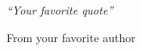 \documentclass[a4paper, 11pt, twoside, openright]{Thesis}  %
\numberwithin{algorithm}{chapter}
\begin{document}
 

 
\pagestyle{empty}
\mbox{}
\clearpage
\pagestyle{empty}  %

\null\vfill
\textit{``Your favorite quote''}

\begin{flushright}
From your favorite author\end{flushright}

\vfill\vfill\vfill\vfill\vfill\vfill\null
\clearpage  %
\pagestyle{empty}
\mbox{}
\clearpage

\clearpage  %
\pagestyle{empty}
\mbox{}
\clearpage
{}  %

\clearpage  %

\pagestyle{fancy}  %
\end{document}
